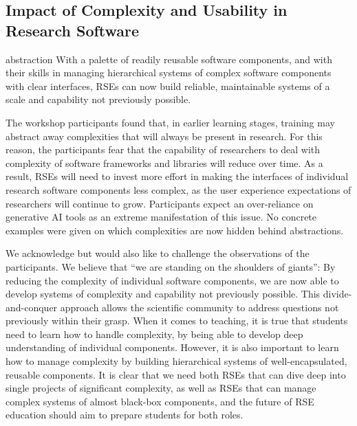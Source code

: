 \documentclass{eceasst}
\begin{document}
\subsection{Impact of Complexity and Usability in Research Software}
\begin{whatis}{}{abstraction}
With a palette of readily reusable software components,
and with their skills in managing hierarchical systems of complex software components with clear interfaces,
RSEs can now build reliable, maintainable systems of a scale and capability not previously possible.
\end{whatis}

The workshop participants found that, in earlier learning stages,
training may abstract away complexities that will always be present in research.
For this reason, the participants fear that the capability of researchers to deal with complexity
of software frameworks and libraries will reduce over time.
As a result, RSEs will need to invest more effort in making the interfaces of individual research software components
less complex, as the user experience expectations of researchers will continue to grow.
Participants expect an over-reliance on generative AI tools as an extreme manifestation of this issue.
No concrete examples were given on which complexities are now hidden behind abstractions.

We acknowledge but would also like to challenge the observations of the participants.
We believe that ``we are standing on the shoulders of giants'':
By reducing the complexity of individual software components,
we are now able to develop systems of complexity and capability not previously possible.
This divide-and-conquer approach allows the scientific community to address questions not previously within their grasp.
When it comes to teaching, it is true that students need to learn how to handle complexity,
by being able to develop deep understanding of individual components.
However, it is also important to learn how to manage complexity
by building hierarchical systems of well-encapsulated, reusable components.
It is clear that we need both RSEs that can dive deep into single projects of significant complexity,
as well as RSEs that can manage complex systems of almost black-box components,
and the future of RSE education should aim to prepare students for both roles.
\end{document}
